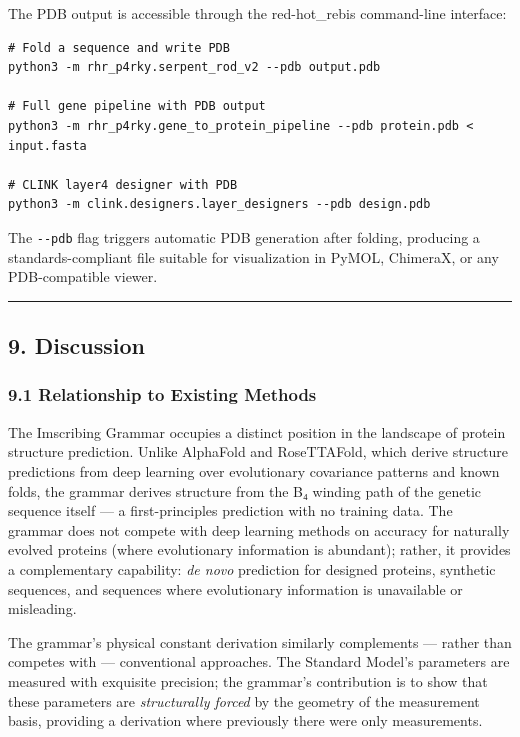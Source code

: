 \documentclass[12pt,a4paper]{article}
\begin{document}
The PDB output is accessible through the red-hot\_rebis command-line
interface:

\begin{verbatim}
# Fold a sequence and write PDB
python3 -m rhr_p4rky.serpent_rod_v2 --pdb output.pdb

# Full gene pipeline with PDB output
python3 -m rhr_p4rky.gene_to_protein_pipeline --pdb protein.pdb < input.fasta

# CLINK layer4 designer with PDB
python3 -m clink.designers.layer_designers --pdb design.pdb
\end{verbatim}

The \texttt{-\/-pdb} flag triggers automatic PDB generation after
folding, producing a standards-compliant file suitable for visualization
in PyMOL, ChimeraX, or any PDB-compatible viewer.

\begin{center}\rule{0.5\linewidth}{0.5pt}\end{center}

\hypertarget{discussion}{%
\subsection{9. Discussion}\label{discussion}}

\hypertarget{relationship-to-existing-methods}{%
\subsubsection{9.1 Relationship to Existing
Methods}\label{relationship-to-existing-methods}}

The Imscribing Grammar occupies a distinct position in the landscape of
protein structure prediction. Unlike AlphaFold and RoseTTAFold, which
derive structure predictions from deep learning over evolutionary
covariance patterns and known folds, the grammar derives structure from
the B₄ winding path of the genetic sequence itself --- a
first-principles prediction with no training data. The grammar does not
compete with deep learning methods on accuracy for naturally evolved
proteins (where evolutionary information is abundant); rather, it
provides a complementary capability: \emph{de novo} prediction for
designed proteins, synthetic sequences, and sequences where evolutionary
information is unavailable or misleading.

The grammar's physical constant derivation similarly complements ---
rather than competes with --- conventional approaches. The Standard
Model's parameters are measured with exquisite precision; the grammar's
contribution is to show that these parameters are \emph{structurally
forced} by the geometry of the measurement basis, providing a derivation
where previously there were only measurements.
\end{document}
